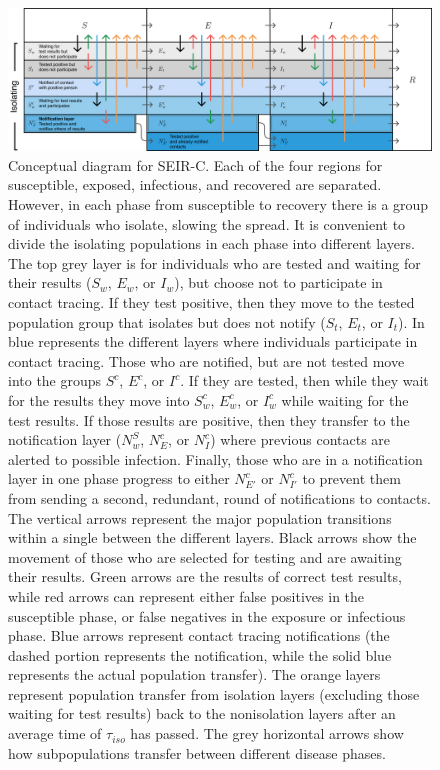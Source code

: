 \documentclass[notitlepage, superscriptaddress]{revtex4-2}
\begin{document}
\begin{figure}
\centering
\includegraphics[width=7in]{SEIR-C_diagram.png}
\caption{\label{f:SEIR-C}
 Conceptual diagram for SEIR-C. Each of the four regions for susceptible, exposed, infectious, and recovered are separated. However, in each phase from susceptible to recovery there is a group of individuals who isolate, slowing the spread. It is convenient to divide the isolating populations in each phase into different layers. The top grey layer is for individuals who are tested and waiting for their results ($S_{w}$, $E_{w}$, or $I_{w}$), but choose not to participate in contact tracing. If they test positive, then they move to the tested population group that isolates but does not notify ($S_{t}$, $E_{t}$, or $I_{t}$). In blue represents the different layers where individuals participate in contact tracing. Those who are notified, but are not tested move into the groups $S^{c}$, $E^{c}$, or $I^{c}$. If they are tested, then while they wait for the results they move into $S^{c}_{w}$, $E^{c}_{w}$, or $I^{c}_{w}$ while waiting for the test results. If those results are positive, then they transfer to the notification layer ($N^{S}_{w}$, $N^{c}_{E}$, or $N^{c}_{I}$) where previous contacts are alerted to possible infection. Finally, those who are in a notification layer in one phase progress to either $N^{c}_{E'}$ or $N^{c}_{I'}$ to prevent them from sending a second, redundant, round of notifications to contacts. The vertical arrows represent the major population transitions within a single between the different layers. Black arrows show the movement of those who are selected for testing and are awaiting their results. Green arrows are the results of correct test results, while red arrows can represent either false positives in the susceptible phase, or false negatives in the exposure or infectious phase. Blue arrows represent contact tracing notifications (the dashed portion represents the notification, while the solid blue represents the actual population transfer). The orange layers represent population transfer from isolation layers (excluding those waiting for test results) back to the nonisolation layers after an average time of $\tau_{iso}$ has passed. The grey horizontal arrows show how subpopulations transfer between different disease phases.}
\end{figure}
\end{document}
